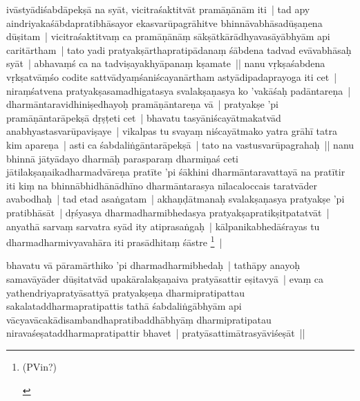 \documentclass[article,a4paper]{memoir}
\begin{document}
ivā\-styā\-diśabdā\-pekṣā\- na syā\-t, vicitraśaktitvā\-t pramā\-ṇā\-nā\-m iti | tad apy aindriyakaśā\-bdapratibhā\-sayor ekasvarū\-pagrā\-hitve bhinnā\-vabhā\-sadū\-ṣaṇena dū\-ṣitam | vicitraśaktitvaṃ ca pramā\-ṇā\-nā\-ṃ sā\-kṣā\-tkā\-rā\-dhyavasā\-yā\-bhyā\-m api caritā\-rtham | tato yadi pratyakṣā\-rthapratipā\-danaṃ śā\-bdena tadvad evā\-vabhā\-saḥ syā\-t | abhavaṃś ca na tadviṣayakhyā\-panaṃ kṣamate || \label{thakur75-62.6} nanu vṛkṣaśabdena vṛkṣatvā\-ṃśo codite sattvā\-dyaṃśaniścayanā\-rtham astyā\-dipadaprayoga iti cet | \label{thakur75-62.8} niraṃśatvena pratyakṣasamadhigatasya svalakṣaṇasya ko 'vakā\-śaḥ padā\-ntareṇa | dharmā\-ntaravidhiniṣedhayoḥ pramā\-ṇā\-ntareṇa vā\- | pratyakṣe 'pi pramā\-ṇā\-ntarā\-pekṣā\- dṛṣṭeti cet | bhavatu tasyā\-niścayā\-tmakatvā\-d anabhyastasvarū\-paviṣaye | vikalpas tu svayaṃ niścayā\-tmako yatra grā\-hī\- tatra kim apareṇa | asti ca śabdaliṅgā\-ntarā\-pekṣā\- | tato na vastusvarū\-pagrahaḥ || \label{thakur75-62.13} nanu bhinnā\- jā\-tyā\-dayo dharmā\-ḥ parasparaṃ dharmiṇaś ceti jā\-tilakṣaṇaikadharmadvā\-reṇa pratī\-te 'pi śā\-khini dharmā\-ntaravattayā\- na pratī\-tir iti kiṃ na bhinnā\-bhidhā\-nā\-dhī\-no dharmā\-ntarasya nī\-lacaloccais taratvā\-der avabodhaḥ | tad etad asaṅgatam | akhaṇḍā\-tmanaḥ svalakṣaṇasya pratyakṣe 'pi pratibhā\-sā\-t | dṛśyasya dharmadharmibhedasya pratyakṣapratikṣitpatatvā\-t | anyathā\- sarvaṃ sarvatra syā\-d ity atiprasaṅgaḥ | kā\-lpanikabhedā\-śrayas tu dharmadharmivyavahā\-ra iti prasā\-dhitaṃ śā\-stre \footnote{\begin{english}(PVin?)\end{english}} |
	\pend
      

	  \pstart bhavatu vā\- pā\-ramā\-rthiko 'pi dharmadharmibhedaḥ | tathā\-py anayoḥ samavā\-yā\-der dū\-ṣitatvā\-d upakā\-ralakṣaṇaiva pratyā\-sattir eṣitavyā\- | evaṃ ca yathendriyapratyā\-sattyā\- pratyakṣeṇa dharmipratipattau sakalataddharmapratipattis tathā\- śabdaliṅgā\-bhyā\-m api vā\-cyavā\-cakā\-disambandhapratibaddhā\-bhyā\-ṃ dharmipratipatau niravaśeṣataddharmapratipattir bhavet | pratyā\-sattimā\-trasyā\-viśeṣā\-t ||
	\pend
      
\end{document}
